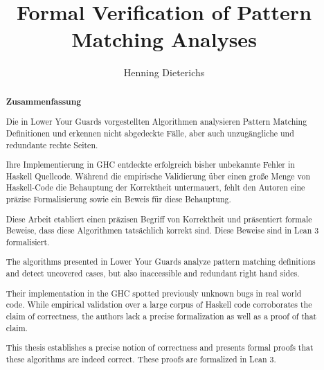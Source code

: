 \documentclass[parskip=no,12pt,a4paper,twoside,headings=openright]{scrreprt}
\title{Formal Verification of Pattern Matching Analyses}
\author{Henning Dieterichs}
\begin{document}
\begin{otherlanguage}{ngerman} %
	\mytitlepage
\end{otherlanguage}

\begin{abstract}
	\begin{center}\Huge\textbf{\textsf{Zusammenfassung}}
	\end{center}
	\vfill
    Die in Lower Your Guards vorgestellten Algorithmen analysieren Pattern Matching Definitionen
	und erkennen nicht abgedeckte Fälle, aber auch unzugängliche und redundante rechte Seiten.
	
	Ihre Implementierung in GHC entdeckte erfolgreich bisher unbekannte Fehler in Haskell Quellcode.
    Während die empirische Validierung über einen große Menge von Haskell-Code die Behauptung der Korrektheit untermauert,
    fehlt den Autoren eine präzise Formalisierung sowie ein Beweis für diese Behauptung.
	
	Diese Arbeit etabliert einen präzisen Begriff von Korrektheit und
	präsentiert formale Beweise, dass diese Algorithmen tatsächlich korrekt sind.
	Diese Beweise sind in Lean 3 formalisiert.

	\vfill

	The algorithms presented in Lower Your Guards analyze pattern matching definitions
	and detect uncovered cases, but also inaccessible and redundant right hand sides.
	
	Their implementation in the GHC spotted previously unknown bugs in real world code.
    While empirical validation over a large corpus of Haskell code corroborates the claim of correctness, the authors lack a precise formalization as well as a proof of that claim.
	
	This thesis establishes a precise notion of correctness and
	presents formal proofs that these algorithms are indeed correct.
	These proofs are formalized in Lean 3.
	\vfill

\end{abstract}

\tableofcontents










\end{document}
